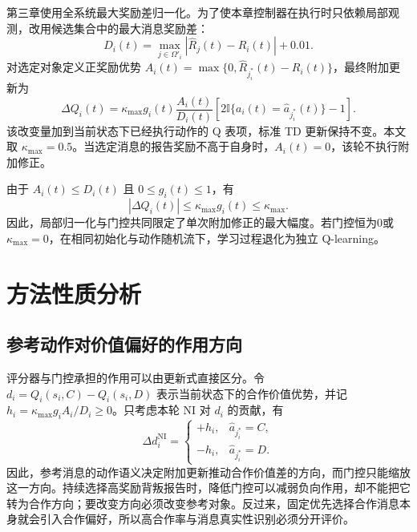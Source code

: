 第三章使用全系统最大奖励差归一化。为了使本章控制器在执行时只依赖局部观测，改用候选集合中的最大消息奖励差：
\begin{equation}
 D_i(t)=\max_{j\in\Omega'_i}|\widehat R_j(t)-R_i(t)|+0.01.
 \label{eq:w2-local-normalizer}
\end{equation}
对选定对象定义正奖励优势
$A_i(t)=\max\{0,\widehat R_{j_i^*}(t)-R_i(t)\}$，最终附加更新为
\begin{equation}
 \Delta Q_i(t)=\kappa_{\max}g_i(t)\frac{A_i(t)}{D_i(t)}
 \left[2\mathbb I\{a_i(t)=\widehat a_{j_i^*}(t)\}-1\right].
 \label{eq:w2-correction}
\end{equation}
该改变量加到当前状态下已经执行动作的 Q 表项，标准 TD 更新保持不变。本文取 $\kappa_{\max}=0.5$。当选定消息的报告奖励不高于自身时，$A_i(t)=0$，该轮不执行附加修正。

由于 $A_i(t)\leq D_i(t)$ 且 $0\leq g_i(t)\leq1$，有
\begin{equation}
 |\Delta Q_i(t)|\leq\kappa_{\max}g_i(t)\leq\kappa_{\max}.
 \label{eq:w2-single-step-bound}
\end{equation}
因此，局部归一化与门控共同限定了单次附加修正的最大幅度。若门控恒为0或 $\kappa_{\max}=0$，在相同初始化与动作随机流下，学习过程退化为独立 Q-learning。

\section{方法性质分析}
\subsection{参考动作对价值偏好的作用方向}

评分器与门控承担的作用可以由更新式直接区分。令
$d_i=Q_i(s_i,C)-Q_i(s_i,D)$ 表示当前状态下的合作价值优势，并记
$h_i=\kappa_{\max}g_iA_i/D_i\geq0$。只考虑本轮 NI 对 $d_i$ 的贡献，有
\begin{equation}
 \Delta d_i^{\mathrm{NI}}=
 \begin{cases}
 +h_i, & \widehat a_{j_i^*}=C,\\
 -h_i, & \widehat a_{j_i^*}=D.
 \end{cases}
 \label{eq:w2-preference-direction}
\end{equation}
因此，参考消息的动作语义决定附加更新推动合作价值差的方向，而门控只能缩放这一方向。持续选择高奖励背叛报告时，降低门控可以减弱负向作用，却不能把它转为合作方向；要改变方向必须改变参考对象。反过来，固定优先选择合作消息本身就会引入合作偏好，所以高合作率与消息真实性识别必须分开评价。

